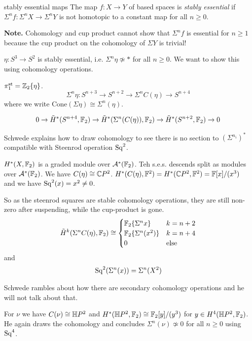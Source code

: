 \documentclass[language=english]{TemplateLecture}
\begin{document}
\begin{defi}{stably essential maps}{}
The map \(f\colon X\to Y\) of based spaces is \emph{stably essential} if \(\Sigma^nf\colon \Sigma^n X\to \Sigma^n Y\) is not homotopic to a constant map for all \(n\geq 0\).
\end{defi}

\textbf{Note.} Cohomology and cup product cannot show that \(\Sigma^nf\) is essential for \(n\geq 1\) because the cup product on the cohomology of \(\Sigma Y\) is trivial!

\(\eta\colon S^3\to S^2\) is stably essential, i.e. \(\Sigma^n \eta \not\simeq *\) for all \(n\geq 0\). We want to show this using cohomology operations.

\begin{corollary}
    \(\pi_1^{\mathrm{st}} = \mathbb{Z}_2\{\eta\}\).
    \[\Sigma^n\eta \colon S^{n+3}\to S^{n+2}\to \Sigma^n C(\eta) \to S^{n+4}\]
    where we write \(\mathrm{Cone}(\Sigma \eta) \cong \Sigma^n(\eta)\).

    \[0\to \tilde H^*(S^{n+4}, \mathbb{F}_2)\to \tilde H^*(\Sigma^n(C(\eta)), \mathbb{F}_2) \to \tilde H^*(S^{n+2}, \mathbb{F}_2)\to 0\]
\end{corollary}

Schwede explains how to draw cohomology to see there is no section to \((\Sigma^{n_i})^*\) compatible with Steenrod operation \(\mathrm{Sq}^2\).

\(H^*(X,\mathbb{F}_2)\) is a graded module over \(\mathcal{A}^*(\mathbb{F}_2)\). Teh s.e.s. descends split as modules over \(\mathcal{A}^*(\mathbb{F}_2)\). We have \(C(\eta)\cong \mathbb{C} P^2\). \(H^*(C(\eta), \mathbb{F}^2) = H^*(\mathbb{C} P^2, \mathbb{F}^2) = \mathbb{F}[x]/(x^3)\) and we have \(\mathrm{Sq}^2(x) = x^2 \neq 0\).

So as the steenrod squares are stable cohomology operations, they are still non-zero after suspending, while the cup-product is gone.
\[\tilde H^k(\Sigma^n C(\eta), \mathbb{F}_2) \cong \begin{cases}
    \mathbb{F}_2\{\Sigma^n x\} & k = n+2 \\
    \mathbb{F}_2\{\Sigma^n(x^2)\} & k = n+4 \\
    0 & \text{else}
\end{cases}\]
and
\[\mathrm{Sq}^2(\Sigma^n(x)) = \Sigma^n(X^2)\]

Schwede rambles about how there are secondary cohomology operations and he will not talk about that.

For \(\nu\) we have \(C(\nu)\cong \mathbb{H} P^2\) and \(H^*(\mathbb{H} P^2, \mathbb{F}_2)\cong \mathbb{F}_2[y]/(y^3)\) for \(y \in H^4(\mathbb{H} P^2, \mathbb{F}_2)\). He again draws the cohomology and concludes \(\Sigma ^n(\nu) \not \simeq 0\) for all \(n\geq 0\) using \(\mathrm{Sq}^4\).
\end{document}
